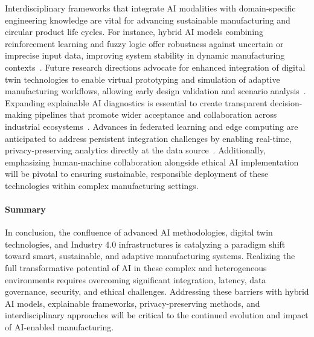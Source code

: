 \documentclass[sigconf]{acmart}
\begin{document}
Interdisciplinary frameworks that integrate AI modalities with domain-specific engineering knowledge are vital for advancing sustainable manufacturing and circular product life cycles. For instance, hybrid AI models combining reinforcement learning and fuzzy logic offer robustness against uncertain or imprecise input data, improving system stability in dynamic manufacturing contexts~\cite{ref29,ref36,ref44}. Future research directions advocate for enhanced integration of digital twin technologies to enable virtual prototyping and simulation of adaptive manufacturing workflows, allowing early design validation and scenario analysis~\cite{ref38}. Expanding explainable AI diagnostics is essential to create transparent decision-making pipelines that promote wider acceptance and collaboration across industrial ecosystems~\cite{ref38}. Advances in federated learning and edge computing are anticipated to address persistent integration challenges by enabling real-time, privacy-preserving analytics directly at the data source~\cite{ref29,ref36}. Additionally, emphasizing human-machine collaboration alongside ethical AI implementation will be pivotal to ensuring sustainable, responsible deployment of these technologies within complex manufacturing settings.

\paragraph{Summary}

In conclusion, the confluence of advanced AI methodologies, digital twin technologies, and Industry 4.0 infrastructures is catalyzing a paradigm shift toward smart, sustainable, and adaptive manufacturing systems. Realizing the full transformative potential of AI in these complex and heterogeneous environments requires overcoming significant integration, latency, data governance, security, and ethical challenges. Addressing these barriers with hybrid AI models, explainable frameworks, privacy-preserving methods, and interdisciplinary approaches will be critical to the continued evolution and impact of AI-enabled manufacturing.
\end{document}
